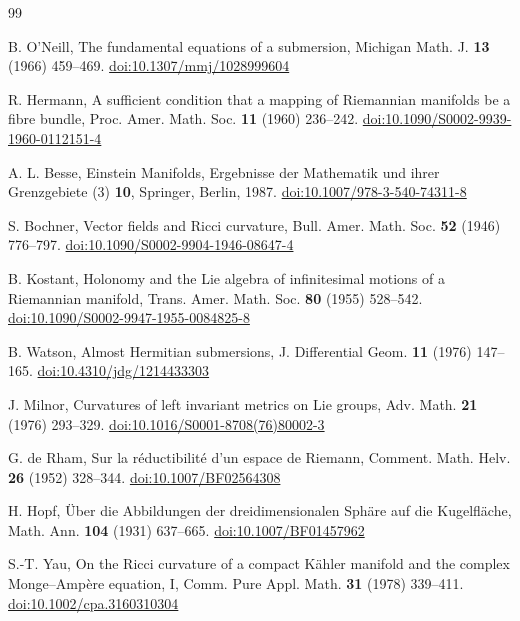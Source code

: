 \documentclass[11pt,reqno]{amsart}
\theoremstyle{plain}
\theoremstyle{definition}
\begin{document}
\begin{thebibliography}{99}\raggedright

 B. O'Neill, The fundamental equations of a submersion, Michigan Math. J. \textbf{13} (1966) 459--469. \href{https://doi.org/10.1307/mmj/1028999604}{doi:10.1307/mmj/1028999604}

 R. Hermann, A sufficient condition that a mapping of Riemannian manifolds be a fibre bundle, Proc. Amer. Math. Soc. \textbf{11} (1960) 236--242. \href{https://doi.org/10.1090/S0002-9939-1960-0112151-4}{doi:10.1090/S0002-9939-1960-0112151-4}

 A. L. Besse, Einstein Manifolds, Ergebnisse der Mathematik und ihrer Grenzgebiete (3) \textbf{10}, Springer, Berlin, 1987. \href{https://doi.org/10.1007/978-3-540-74311-8}{doi:10.1007/978-3-540-74311-8}

 S. Bochner, Vector fields and Ricci curvature, Bull. Amer. Math. Soc. \textbf{52} (1946) 776--797. \href{https://doi.org/10.1090/S0002-9904-1946-08647-4}{doi:10.1090/S0002-9904-1946-08647-4}

 B. Kostant, Holonomy and the Lie algebra of infinitesimal motions of a Riemannian manifold, Trans. Amer. Math. Soc. \textbf{80} (1955) 528--542. \href{https://doi.org/10.1090/S0002-9947-1955-0084825-8}{doi:10.1090/S0002-9947-1955-0084825-8}

 B. Watson, Almost Hermitian submersions, J. Differential Geom. \textbf{11} (1976) 147--165. \href{https://doi.org/10.4310/jdg/1214433303}{doi:10.4310/jdg/1214433303}

 J. Milnor, Curvatures of left invariant metrics on Lie groups, Adv. Math. \textbf{21} (1976) 293--329. \href{https://doi.org/10.1016/S0001-8708(76)80002-3}{doi:10.1016/S0001-8708(76)80002-3}

 G. de Rham, Sur la r\'eductibilit\'e d'un espace de Riemann, Comment. Math. Helv. \textbf{26} (1952) 328--344. \href{https://doi.org/10.1007/BF02564308}{doi:10.1007/BF02564308}

 H. Hopf, \"Uber die Abbildungen der dreidimensionalen Sph\"are auf die Kugelfl\"ache, Math. Ann. \textbf{104} (1931) 637--665. \href{https://doi.org/10.1007/BF01457962}{doi:10.1007/BF01457962}

 S.-T. Yau, On the Ricci curvature of a compact K\"ahler manifold and the complex Monge--Amp\`ere equation, I, Comm. Pure Appl. Math. \textbf{31} (1978) 339--411. \href{https://doi.org/10.1002/cpa.3160310304}{doi:10.1002/cpa.3160310304}


\end{thebibliography}
\end{document}
